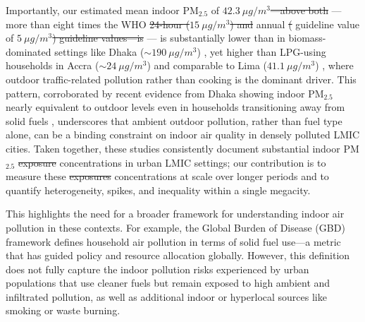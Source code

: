 \documentclass[9pt,twocolumn,twoside]{pnas-new}
\providecommand{\DIFadd}[1]{{\protect\color{red}#1}}
\providecommand{\DIFdel}[1]{{\protect\color{red}\protect\sout{#1}}}
\begin{document}
Importantly, our estimated mean indoor PM$_{2.5}$ of $42.3~\mu g/m^3$\DIFdel{—above both} \DIFadd{--- more than eight times} the WHO \DIFdel{24-hour ($15~\mu g/m^3$) and} annual \DIFdel{(} \DIFadd{guideline value of} $5~\mu g/m^3$\DIFdel{) guideline values—is} \DIFadd{--- is} substantially lower than in biomass-dominated settings like Dhaka ($\sim 190~\mu g/m^3$) \citep{GURLEY201311}, yet higher than LPG-using households in Accra ($\sim 24~\mu g/m^3$) \citep{zhou2011household} and comparable to Lima ($41.1~\mu g/m^3$) \citep{kephart2020indoor}, where outdoor traffic-related pollution rather than cooking is the dominant driver. This pattern, corroborated by recent evidence from Dhaka showing indoor PM$_{2.5}$ nearly equivalent to outdoor levels even in households transitioning away from solid fuels \citep{Sahaetal2025}, underscores that ambient outdoor pollution, rather than fuel type alone, can be a binding constraint on indoor air quality in densely polluted LMIC cities. Taken together, these studies consistently document substantial indoor PM$_{2.5}$ \DIFdel{exposure} \DIFadd{concentrations} in urban LMIC settings; our contribution is to measure these \DIFdel{exposures} \DIFadd{concentrations} at scale over longer periods and to quantify heterogeneity, spikes, and inequality within a single megacity.

This highlights the need for a broader framework for understanding indoor air pollution in these contexts. For example, the Global Burden of Disease (GBD) framework defines household air pollution in terms of solid fuel use—a metric that has guided policy and resource allocation globally. However, this definition does not fully capture the indoor pollution risks experienced by urban populations that use cleaner fuels but remain exposed to high ambient and infiltrated pollution, as well as additional indoor or hyperlocal sources like smoking or waste burning. 
\end{document}
